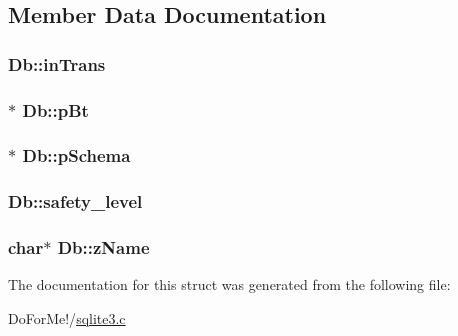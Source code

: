 \subsection{Member Data Documentation}
\hypertarget{struct_db_a4c5495ebea317212f0b41aa2795a7bc9}{
\subsubsection[{in\-Trans}]{ Db\-::in\-Trans}}\label{struct_db_a4c5495ebea317212f0b41aa2795a7bc9}
\hypertarget{struct_db_a0633e5a6abfc39246d07cc6a417a5852}{
\subsubsection[{p\-Bt}]{$\ast$ Db\-::p\-Bt}}\label{struct_db_a0633e5a6abfc39246d07cc6a417a5852}
\hypertarget{struct_db_afd8647a83a4a7053231b92814520d6d4}{
\subsubsection[{p\-Schema}]{$\ast$ Db\-::p\-Schema}}\label{struct_db_afd8647a83a4a7053231b92814520d6d4}
\hypertarget{struct_db_a04597a5c023d8b328193450b177ff24c}{
\subsubsection[{safety\-\_\-level}]{ Db\-::safety\-\_\-level}}\label{struct_db_a04597a5c023d8b328193450b177ff24c}
\hypertarget{struct_db_a6df2b5d7c8fd68e92cea961d9e3b279b}{
\subsubsection[{z\-Name}]{\setlength{\rightskip}{0pt plus 5cm}char$\ast$ Db\-::z\-Name}}\label{struct_db_a6df2b5d7c8fd68e92cea961d9e3b279b}


The documentation for this struct was generated from the following file\-:\begin{DoxyCompactItemize}
\item 
Do\-For\-Me!/\hyperlink{sqlite3_8c}{sqlite3.\-c}\end{DoxyCompactItemize}

